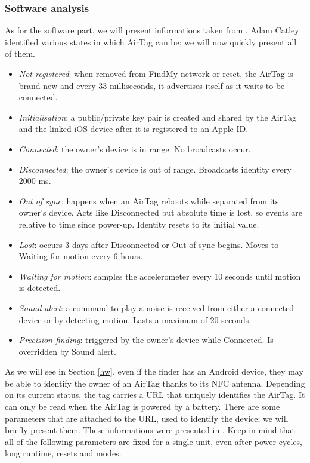 \documentclass[english]{article}
\begin{document}
\subsubsection{Software analysis}
As for the software part, we will present informations taken from \cite{reverse}. Adam Catley identified various states in which AirTag can be; we will now quickly present all of them.
\begin{itemize}
  \item \textit{Not registered}: when removed from FindMy network or reset, the AirTag is brand new and every 33 milliseconds, it advertises itself as it waits to be connected.
  \item \textit{Initialisation}: a public/private key pair is created and shared by the AirTag and the linked iOS device after it is registered to an Apple ID.
  \item \textit{Connected}: the owner’s device is in range. No broadcasts occur.
  \item \textit{Disconnected}: the owner’s device is out of range. Broadcasts identity every 2000 ms.
  \item \textit{Out of sync}: happens when an AirTag reboots while separated from its owner’s device. Acts like Disconnected but absolute time is lost, so events are relative to time since power-up. Identity resets to its initial value.
  \item \textit{Lost}: occurs 3 days after Disconnected or Out of sync begins. Moves to Waiting for motion every 6 hours.
  \item \textit{Waiting for motion}: samples the accelerometer every 10 seconds until motion is detected.
  \item \textit{Sound alert}: a command to play a noise is received from either a connected device or by detecting motion. Lasts a maximum of 20 seconds.
  \item \textit{Precision finding}: triggered by the owner’s device while Connected. Is overridden by Sound alert.
\end{itemize}
As we will see in Section \ref{hw}, even if the finder has an Android device, they may be able to identify the owner of an AirTag thanks to its NFC antenna. Depending on its current status, the tag carries a URL that uniquely identifies the AirTag. It can only be read when the AirTag is powered by a battery. There are some parameters that are attached to the URL, used to identify the device; we will briefly present them. These informations were presented in \cite{reverse}. Keep in mind that all of the following parameters are fixed for a single unit, even after power cycles, long runtime, resets and modes.
\end{document}
